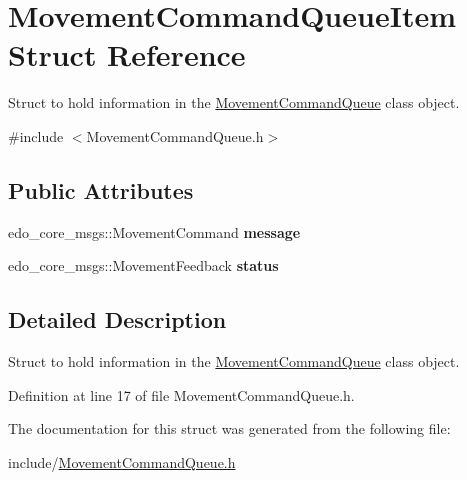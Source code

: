 \hypertarget{structMovementCommandQueueItem}{}\section{Movement\+Command\+Queue\+Item Struct Reference}
\label{structMovementCommandQueueItem}


Struct to hold information in the \hyperlink{classMovementCommandQueue}{Movement\+Command\+Queue} class object.  




{\ttfamily \#include $<$Movement\+Command\+Queue.\+h$>$}

\subsection*{Public Attributes}
\begin{DoxyCompactItemize}
\item 
edo\+\_\+core\+\_\+msgs\+::\+Movement\+Command {\bfseries message}\hypertarget{structMovementCommandQueueItem_a1a1cdf0a3174a55b0cd7e408d7da8932}{}\label{structMovementCommandQueueItem_a1a1cdf0a3174a55b0cd7e408d7da8932}

\item 
edo\+\_\+core\+\_\+msgs\+::\+Movement\+Feedback {\bfseries status}\hypertarget{structMovementCommandQueueItem_aa509cac8388938868457ae6028b0247c}{}\label{structMovementCommandQueueItem_aa509cac8388938868457ae6028b0247c}

\end{DoxyCompactItemize}


\subsection{Detailed Description}
Struct to hold information in the \hyperlink{classMovementCommandQueue}{Movement\+Command\+Queue} class object. 

Definition at line 17 of file Movement\+Command\+Queue.\+h.



The documentation for this struct was generated from the following file\+:\begin{DoxyCompactItemize}
\item 
include/\hyperlink{MovementCommandQueue_8h}{Movement\+Command\+Queue.\+h}\end{DoxyCompactItemize}
